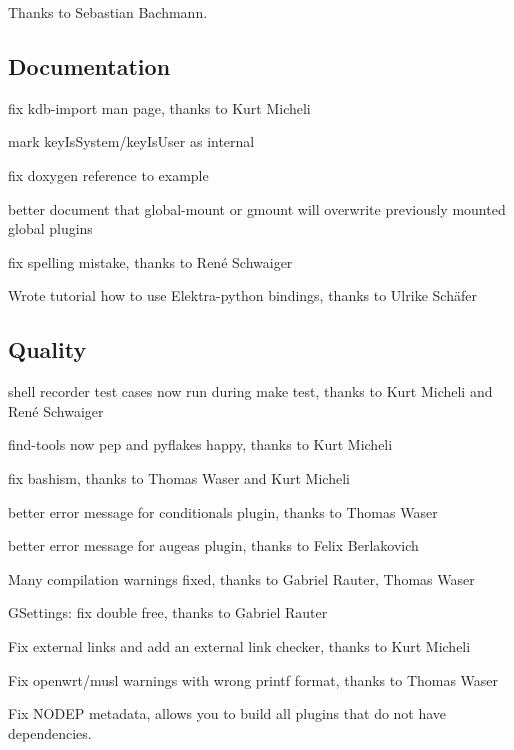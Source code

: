 Thanks to Sebastian Bachmann.

\subsection*{Documentation}


\begin{DoxyItemize}
\item fix kdb-\/import man page, thanks to Kurt Micheli
\item mark key\+Is\+System/key\+Is\+User as internal
\item fix doxygen reference to example
\item better document that {\ttfamily global-\/mount} or {\ttfamily gmount} will overwrite previously mounted global plugins
\item fix spelling mistake, thanks to René Schwaiger
\item Wrote tutorial how to use Elektra-\/python bindings, thanks to Ulrike Schäfer
\end{DoxyItemize}

\subsection*{Quality}


\begin{DoxyItemize}
\item shell recorder test cases now run during {\ttfamily make test}, thanks to Kurt Micheli and René Schwaiger
\item find-\/tools now pep and pyflakes happy, thanks to Kurt Micheli
\item fix bashism, thanks to Thomas Waser and Kurt Micheli
\item better error message for conditionals plugin, thanks to Thomas Waser
\item better error message for augeas plugin, thanks to Felix Berlakovich
\item Many compilation warnings fixed, thanks to Gabriel Rauter, Thomas Waser
\item G\+Settings\+: fix double free, thanks to Gabriel Rauter
\item Fix external links and add an external link checker, thanks to Kurt Micheli
\item Fix openwrt/musl warnings with wrong printf format, thanks to Thomas Waser
\item Fix N\+O\+D\+E\+P metadata, allows you to build all plugins that do not have dependencies.
\end{DoxyItemize}

